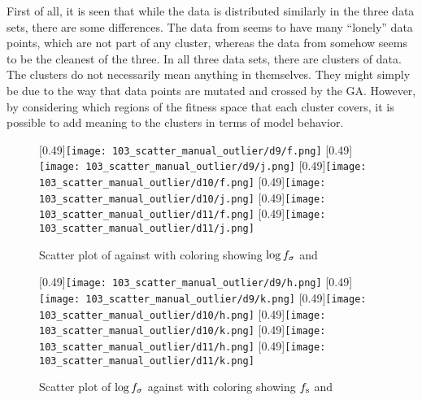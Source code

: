 First of all, it is seen that while the data is distributed similarly in the three data sets, there are some differences. The data from \dnine{} seems to have many ``lonely'' data points, which are not part of any cluster, whereas the data from \dten{} somehow seems to be the cleanest of the three. In all three data sets, there are clusters of data. The clusters do not necessarily mean anything in themselves. They might simply be due to the way that data points are mutated and crossed by the GA. However, by considering which regions of the fitness space that each cluster covers, it is possible to add meaning to the clusters in terms of model behavior.

\begin{figure}
\centering
{}[0.49\linewidth]{\texttt{[image: 103\_scatter\_manual\_outlier/d9/f.png]}}
[0.49\linewidth]{\texttt{[image: 103\_scatter\_manual\_outlier/d9/j.png]}}
[0.49\linewidth]{\texttt{[image: 103\_scatter\_manual\_outlier/d10/f.png]}}
[0.49\linewidth]{\texttt{[image: 103\_scatter\_manual\_outlier/d10/j.png]}}
[0.49\linewidth]{\texttt{[image: 103\_scatter\_manual\_outlier/d11/f.png]}}
[0.49\linewidth]{\texttt{[image: 103\_scatter\_manual\_outlier/d11/j.png]}}
\caption{Scatter plot of \roundstable against \timetoreachnewfundamental with coloring showing $\log f_\sigma$ and \overshoot}
\label{figure:scatter_fitness_inliers_a}
\end{figure}

\begin{figure}
\centering
{}[0.49\linewidth]{\texttt{[image: 103\_scatter\_manual\_outlier/d9/h.png]}}
[0.49\linewidth]{\texttt{[image: 103\_scatter\_manual\_outlier/d9/k.png]}}
[0.49\linewidth]{\texttt{[image: 103\_scatter\_manual\_outlier/d10/h.png]}}
[0.49\linewidth]{\texttt{[image: 103\_scatter\_manual\_outlier/d10/k.png]}}
[0.49\linewidth]{\texttt{[image: 103\_scatter\_manual\_outlier/d11/h.png]}}
[0.49\linewidth]{\texttt{[image: 103\_scatter\_manual\_outlier/d11/k.png]}}
\caption{Scatter plot of $\log f_\sigma$ against \timetoreachnewfundamental with coloring showing $f_\text{s}$ and \overshoot}
\label{figure:d9_scatter_fitness_inliers_b}
\end{figure}



